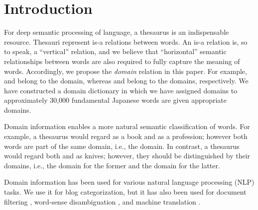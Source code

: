 \documentclass[english]{jnlp_1.4_rep}
\newcommand{\word}[1]{}
\newcommand{\dom}[1]{}
\begin{document}
\maketitle

\section{Introduction}

For deep semantic processing of language, a thesaurus is an
indispensable resource.
Thesauri represent is-a relations between words. 
An is-a relation is, so to speak, a ``vertical'' relation, and
we believe that ``horizontal'' semantic relationships between
words are also required to fully capture the meaning of words.
Accordingly, we propose the \emph{domain} relation in this paper.
For example, \word{textbook} and \word{teacher} belong to the
\dom{education} domain, whereas \word{kitchen knife} and
\word{surgical knife} belong to the \dom{diet} 
\dom{health} domains, respectively.
We have constructed a domain dictionary in which 
we have assigned domains to approximately 30,000
fundamental Japanese words are given appropriate domains.

Domain information enables a more natural semantic classification of
words. 
For example, a thesaurus would regard \word{textbook} as a book and
\word{teacher} as a profession; however both words are part of the same 
domain, i.e., the \dom{education} domain.
In contrast, a thesaurus would regard both \word{kitchen knife}
and \word{surgical knife} as knives; however, they should be distinguished 
by their domains, i.e., the \dom{diet} domain for the former and
the \dom{health} domain for the latter.

Domain information has been used for various natural language
processing (NLP) tasks.
We use it for blog categorization, but it has also been used for
document filtering
\cite{Liddy:Paik:1993},
word-sense disambiguation
\cite{Rigau:Atserias:Agirre:1997,Tanaka:Bond:Baldwin:Fujita:Hashimoto:2007},
and
machine translation
\cite{Yoshimoto:Kinoshita:Shimazu:1997,Lange:Yang:1999}.
\end{document}
